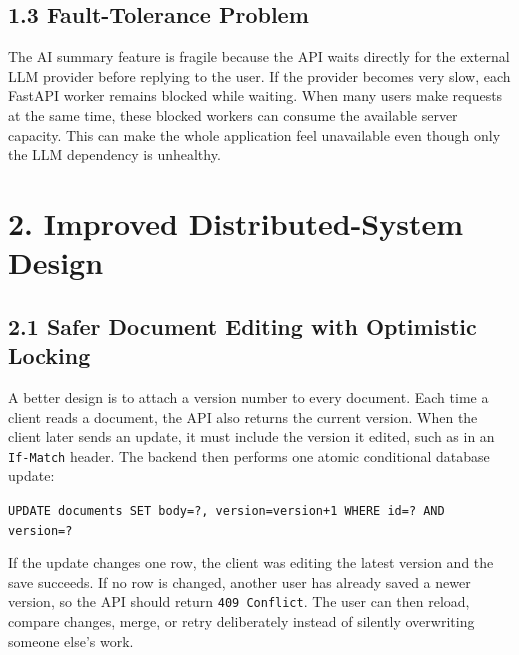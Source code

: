 \documentclass[10pt]{article}
\begin{document}
\subsection*{1.3 Fault-Tolerance Problem}

The AI summary feature is fragile because the API waits directly for the external
LLM provider before replying to the user. If the provider becomes very slow, each
FastAPI worker remains blocked while waiting. When many users make requests at
the same time, these blocked workers can consume the available server capacity.
This can make the whole application feel unavailable even though only the LLM
dependency is unhealthy.

\section*{2. Improved Distributed-System Design}

\subsection*{2.1 Safer Document Editing with Optimistic Locking}

A better design is to attach a version number to every document. Each time a
client reads a document, the API also returns the current version. When the
client later sends an update, it must include the version it edited, such as in
an \texttt{If-Match} header. The backend then performs one atomic conditional
database update:

\texttt{UPDATE documents SET body=?, version=version+1 WHERE id=? AND version=?}

If the update changes one row, the client was editing the latest version and the
save succeeds. If no row is changed, another user has already saved a newer
version, so the API should return \texttt{409 Conflict}. The user can then reload,
compare changes, merge, or retry deliberately instead of silently overwriting
someone else's work.
\end{document}
